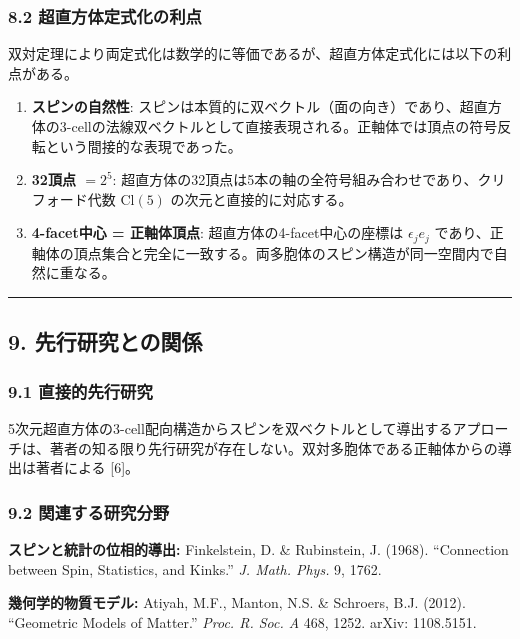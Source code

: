 \documentclass[a4paper,11pt]{ltjsarticle}
\providecommand{\tightlist}{\setlength{\itemsep}{0pt}\setlength{\parskip}{0pt}}
\begin{document}
\subsubsection*{8.2 超直方体定式化の利点}

双対定理により両定式化は数学的に等価であるが、超直方体定式化には以下の利点がある。

\begin{enumerate}
\def\labelenumi{\arabic{enumi}.}
\tightlist
\item
  \textbf{スピンの自然性}: スピンは本質的に双ベクトル（面の向き）であり、超直方体の3-cellの法線双ベクトルとして直接表現される。正軸体では頂点の符号反転という間接的な表現であった。
\item
  \textbf{32頂点 $= 2^5$}: 超直方体の32頂点は5本の軸の全符号組み合わせであり、クリフォード代数 $\mathrm{Cl}(5)$ の次元と直接的に対応する。
\item
  \textbf{4-facet中心 = 正軸体頂点}: 超直方体の4-facet中心の座標は $\epsilon_j e_j$ であり、正軸体の頂点集合と完全に一致する。両多胞体のスピン構造が同一空間内で自然に重なる。
\end{enumerate}

\begin{center}\rule{0.5\linewidth}{0.5pt}\end{center}

\subsection*{9. 先行研究との関係}

\subsubsection*{9.1 直接的先行研究}

5次元超直方体の3-cell配向構造からスピンを双ベクトルとして導出するアプローチは、著者の知る限り先行研究が存在しない。双対多胞体である正軸体からの導出は著者による [6]。

\subsubsection*{9.2 関連する研究分野}

\textbf{スピンと統計の位相的導出:} Finkelstein, D. \& Rubinstein, J. (1968). ``Connection between Spin, Statistics, and Kinks.'' \emph{J. Math. Phys.} 9, 1762.

\textbf{幾何学的物質モデル:} Atiyah, M.F., Manton, N.S. \& Schroers, B.J. (2012). ``Geometric Models of Matter.'' \emph{Proc. R. Soc. A} 468, 1252. arXiv: 1108.5151.
\end{document}
